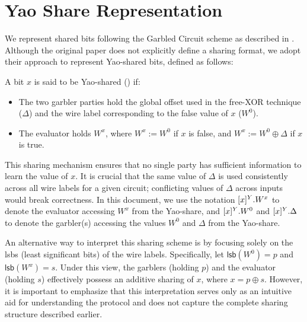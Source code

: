 \section{Yao Share Representation}
\label{sec:yaobit:repr}

We represent shared bits following the Garbled Circuit scheme as described in \cite{CCS:MohRosZha15}. Although the original paper does not explicitly define a sharing format, we adopt their approach to represent Yao-shared bits, defined as follows:

A bit $x$ is said to be Yao-shared () if:

\begin{itemize}
	\item The two garbler parties hold the global offset used in the free-XOR technique ($\Delta$) and the wire label corresponding to the false value of $x$ ($W^0$). 
	\item The evaluator holds $W^x$, where $W^x := W^0$ if $x$ is false, and $W^x := W^0 \oplus \Delta$ if $x$ is true.
\end{itemize}

This sharing mechanism ensures that no single party has sufficient information to learn the value of $x$. It is crucial that the same value of $\Delta$ is used consistently across all wire labels for a given circuit; conflicting values of $\Delta$ across inputs would break correctness. In this document, we use the notation $[x]^{Y}.W^x$ to denote the evaluator accessing $W^x$ from the Yao-share, and $[x]^{Y}.W^0$ and $[x]^{Y}.\Delta$ to denote the garbler(s) accessing the values $W^0$ and $\Delta$ from the Yao-share.

An alternative way to interpret this sharing scheme is by focusing solely on the \textsf{lsb}s (least significant bits) of the wire labels. Specifically, let $\mathsf{lsb}(W^0) = p$ and $\mathsf{lsb}(W^x) = s$. Under this view, the garblers (holding $p$) and the evaluator (holding $s$) effectively possess an additive sharing of $x$, where $x = p \oplus s$. However, it is important to emphasize that this interpretation serves only as an intuitive aid for understanding the protocol and does not capture the complete sharing structure described earlier.
